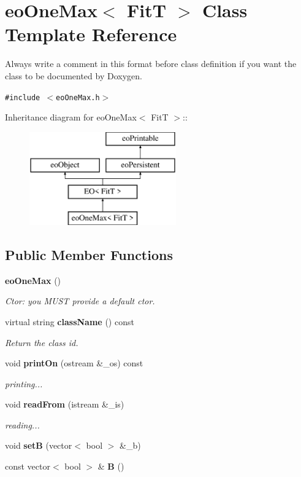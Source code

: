 \section{eo\-One\-Max$<$ Fit\-T $>$ Class Template Reference}
\label{classeo_one_max}
Always write a comment in this format before class definition if you want the class to be documented by Doxygen.  


{\tt \#include $<$eo\-One\-Max.h$>$}

Inheritance diagram for eo\-One\-Max$<$ Fit\-T $>$::\begin{figure}[H]
\begin{center}
\leavevmode
\includegraphics[height=4cm]{classeo_one_max}
\end{center}
\end{figure}
\subsection*{Public Member Functions}
\begin{CompactItemize}
\item 
{\bf eo\-One\-Max} ()
\begin{CompactList}\small\item\em Ctor: you MUST provide a default ctor. \item\end{CompactList}\item 
virtual string {\bf class\-Name} () const 
\begin{CompactList}\small\item\em Return the class id. \item\end{CompactList}\item 
void {\bf print\-On} (ostream \&\_\-os) const 
\begin{CompactList}\small\item\em printing... \item\end{CompactList}\item 
void {\bf read\-From} (istream \&\_\-is)
\begin{CompactList}\small\item\em reading... \item\end{CompactList}\item 
void {\bf set\-B} (vector$<$ bool $>$ \&\_\-b)\label{classeo_one_max_a5}

\item 
const vector$<$ bool $>$ \& {\bf B} ()\label{classeo_one_max_a6}

\end{CompactItemize}
